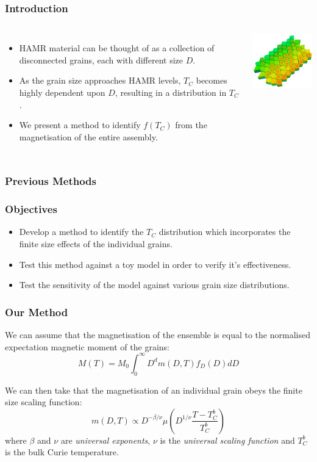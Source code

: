 \documentclass{beamer}
\begin{document}
\begin{frame}
	\frametitle{Introduction}
	\begin{columns}
		\column{7cm}
		\begin{itemize}
			\item{HAMR material can be thought of as a collection of disconnected grains, each with different size $D$.\newline}
			\item{As the grain size approaches HAMR levels, $T_C$ becomes highly dependent upon $D$, resulting in a distribution in $T_C$.\newline}
			\item{We present a method to identify $f(T_C)$ from the magnetisation of the entire assembly.}
		\end{itemize}
		\column{5cm}
		\includegraphics[width=5cm]{Images/grains}
	\end{columns}
\end{frame}

\begin{frame}
	\frametitle{Previous Methods}
\end{frame}

\begin{frame}
	\frametitle{Objectives}
	\begin{itemize}
		\item{Develop a method to identify the $T_C$ distribution which incorporates the finite size effects of the individual grains.\newline}
		\item{Test this method against a toy model in order to verify it's effectiveness.\newline}
		\item{Test the sensitivity of the model against various grain size distributions.\newline}
	\end{itemize}
\end{frame}

\begin{frame}
	\frametitle{Our Method}
	We can assume that the magnetisation of the ensemble is equal to the normalised expectation magnetic moment of the grains:
	$$
	M(T) = M_0\int_0^\infty D^{d} m(D,T) f_D(D) dD
	$$	
	
	We can then take that the magnetisation of an individual grain obeys the finite size scaling function:
	$$
	m(D,T) \propto D^{-\beta/\nu} \mu \left(D^{1/\nu}\frac{T-T_C^b}{T_C^b}\right)
	$$
	where $\beta$ and $\nu$ are \textit{universal exponents}, $\nu$ is the \textit{universal scaling function} and $T_C^b$ is the bulk Curie temperature.
\end{frame}
\end{document}
